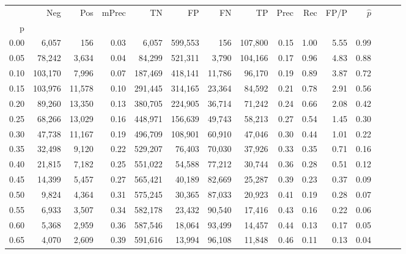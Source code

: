 \begin{tabular}{rrrrrrrrrrrrrrr}
\toprule
{} &      Neg &     Pos & mPrec &       TN &       FP &       FN &       TP &  Prec &   Rec &  FP/P & $\hat{p}$ \\
p    &          &         &       &          &          &          &          &       &       &       &           \\
\midrule
0.00 &    6,057 &     156 &  0.03 &    6,057 &  599,553 &      156 &  107,800 &  0.15 &  1.00 &  5.55 &      0.99 \\
0.05 &   78,242 &   3,634 &  0.04 &   84,299 &  521,311 &    3,790 &  104,166 &  0.17 &  0.96 &  4.83 &      0.88 \\
0.10 &  103,170 &   7,996 &  0.07 &  187,469 &  418,141 &   11,786 &   96,170 &  0.19 &  0.89 &  3.87 &      0.72 \\
0.15 &  103,976 &  11,578 &  0.10 &  291,445 &  314,165 &   23,364 &   84,592 &  0.21 &  0.78 &  2.91 &      0.56 \\
0.20 &   89,260 &  13,350 &  0.13 &  380,705 &  224,905 &   36,714 &   71,242 &  0.24 &  0.66 &  2.08 &      0.42 \\
0.25 &   68,266 &  13,029 &  0.16 &  448,971 &  156,639 &   49,743 &   58,213 &  0.27 &  0.54 &  1.45 &      0.30 \\
0.30 &   47,738 &  11,167 &  0.19 &  496,709 &  108,901 &   60,910 &   47,046 &  0.30 &  0.44 &  1.01 &      0.22 \\
0.35 &   32,498 &   9,120 &  0.22 &  529,207 &   76,403 &   70,030 &   37,926 &  0.33 &  0.35 &  0.71 &      0.16 \\
0.40 &   21,815 &   7,182 &  0.25 &  551,022 &   54,588 &   77,212 &   30,744 &  0.36 &  0.28 &  0.51 &      0.12 \\
0.45 &   14,399 &   5,457 &  0.27 &  565,421 &   40,189 &   82,669 &   25,287 &  0.39 &  0.23 &  0.37 &      0.09 \\
0.50 &    9,824 &   4,364 &  0.31 &  575,245 &   30,365 &   87,033 &   20,923 &  0.41 &  0.19 &  0.28 &      0.07 \\
0.55 &    6,933 &   3,507 &  0.34 &  582,178 &   23,432 &   90,540 &   17,416 &  0.43 &  0.16 &  0.22 &      0.06 \\
0.60 &    5,368 &   2,959 &  0.36 &  587,546 &   18,064 &   93,499 &   14,457 &  0.44 &  0.13 &  0.17 &      0.05 \\
0.65 &    4,070 &   2,609 &  0.39 &  591,616 &   13,994 &   96,108 &   11,848 &  0.46 &  0.11 &  0.13 &      0.04 \\

\end{tabular}
